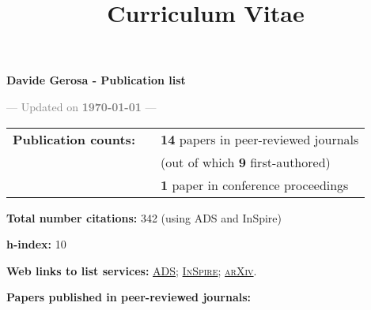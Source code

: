\documentclass[11pt,a4paper,sans]{moderncv}   %
\title{Curriculum Vitae}
\begin{document}
\textcolor{color1}{\begin{center}{\huge  \textbf{Davide Gerosa - Publication list}}\end{center}}

\vspace{-0.5cm}

\begin{center}\textcolor{gray}{ --- Updated on \textbf{\today} ---}\end{center}
\begin{tabular}{rcl}
\textcolor{color1}{\textbf{Publication counts:}}&\hspace{0.3cm} &{\textbf{14} papers in peer-reviewed journals} \\
& &{(out of which \textbf{9} first-authored)}
 \\
& &{\textbf{1} paper in conference proceedings}
\end{tabular}

\textcolor{color1}{\textbf{Total number citations:}} \textbf{} 342 (using ADS and InSpire)

\textcolor{color1}{\textbf{h-index:}} 10

\textcolor{color1}{\textbf{Web links to list services:}}
\href{http://labs.adsabs.harvard.edu/adsabs/search/?q=author%3A%22Gerosa%2C+Davide%22&month_from=&year_from=&month_to=&year_to=&db_f=&nr=&article=1&bigquery=&re_sort_type=CITED&re_sort_dir=desc}{\textsc{ADS}}; 
\href{http://inspirehep.net/search?ln=en&ln=en&p=exactauthor%3AD.Gerosa.1&of=hb&action_search=Search&sf=&so=d&rm=citation&rg=25&sc=0}{\textsc{InSpire}}; 
\href{http://arxiv.org/a/gerosa_d_1.html}{\textsc{arXiv}}.
\vspace{0.5cm}

\textcolor{color1}{\textbf{Papers published in peer-reviewed journals:}}
\vspace{-0.5cm}
\end{document}
